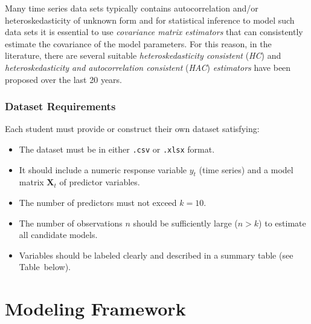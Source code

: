 \documentclass[12pt,thmsa]{article}
\begin{document}
Many time series data sets typically contains autocorrelation and/or
heteroskedasticity of unknown form and for statistical inference to model
such data sets it is essential to use \textsl{covariance matrix estimators}
that can consistently estimate the covariance of the model parameters. For
this reason, in the literature, there are several suitable \textsl{%
heteroskedasticity consistent} (\textsl{HC}) and \textsl{heteroskedasticity
and autocorrelation consistent} (\textsl{HAC}) \textsl{estimators} have been
proposed over the last 20 years.

\vspace{1pt}

\subsubsection{Dataset Requirements}

\vspace{1pt}

Each student must provide or construct their own dataset satisfying:

\vspace{1pt}

\begin{itemize}
\item The dataset must be in either \texttt{.csv} or \texttt{.xlsx} format.

\item It should include a numeric response variable $y_{t}$ (time series)
and a model matrix $\mathbf{X}_{t}$ of predictor variables.

\item The number of predictors must not exceed $k=10$.

\item The number of observations $n$ should be sufficiently large ($n>k$) to
estimate all candidate models.

\item Variables should be labeled clearly and described in a summary table
(see Table~below).
\end{itemize}

\vspace{1pt}\pagebreak

\section*{Modeling Framework}

\vspace{1pt}
\end{document}
